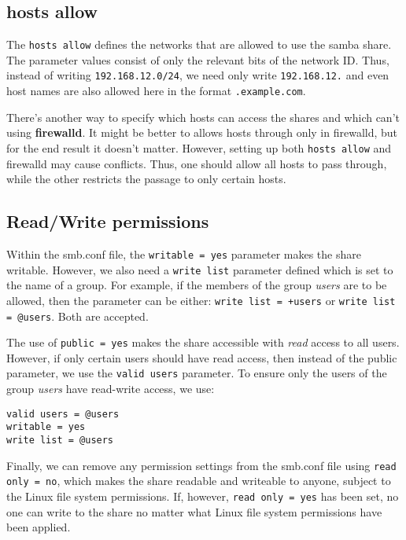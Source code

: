 \subsection{hosts allow}
The \verb|hosts allow| defines the networks that are allowed to use the samba share. The parameter values consist of only the relevant bits of the network ID. Thus, instead of writing \verb|192.168.12.0/24|, we need only write \verb|192.168.12.| and even host names are also allowed here in the format \verb|.example.com|. 

There's another way to specify which hosts can access the shares and which can't using \textbf{firewalld}. It might be better to allows hosts through only in firewalld, but for the end result it doesn't matter. However, setting up both \verb|hosts allow| and firewalld may cause conflicts. Thus, one should allow all hosts to pass through, while the other restricts the passage to only certain hosts. 

\subsection{Read/Write permissions}
Within the smb.conf file, the \verb|writable = yes| parameter makes the share writable. However, we also need a \verb|write list| parameter defined which is set to the name of a group. For example, if the members of the group \textit{users} are to be allowed, then the parameter can be either: \verb|write list = +users| or \verb|write list = @users|. Both are accepted. 

The use of \verb|public = yes| makes the share accessible with \textit{read} access to all users. However, if only certain users should have read access, then instead of the public parameter, we use the \verb|valid users| parameter. To ensure only the users of the group \textit{users} have read-write access, we use:

\vspace{-15pt}
\begin{verbatim}
valid users = @users
writable = yes
write list = @users
\end{verbatim}
\vspace{-10pt}	

\noindent
Finally, we can remove any permission settings from the smb.conf file using \verb|read only = no|, which makes the share readable and writeable to anyone, subject to the Linux file system permissions. If, however, \verb|read only = yes| has been set, no one can write to the share no matter what Linux file system permissions have been applied. 	

